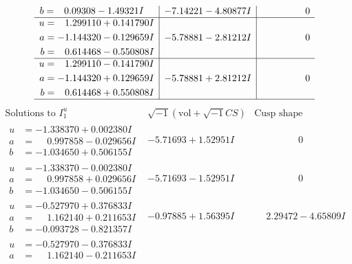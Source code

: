 \documentclass[1p]{elsarticle_modified}
\theoremstyle{definition}
\newcommand{\I}{\sqrt{-1}}
\begin{document}
$$\begin{array}{c|c|c}
\begin{aligned}
b &= \phantom{-}0.09308 - 1.49321 I\end{aligned}
 & -7.14221 - 4.80877 I & \phantom{-0.000000 } 0 \\ \hline\begin{aligned}
u &= \phantom{-}1.299110 + 0.141790 I \\
a &= -1.144320 - 0.129659 I \\
b &= \phantom{-}0.614468 - 0.550808 I\end{aligned}
 & -5.78881 - 2.81212 I & \phantom{-0.000000 } 0 \\ \hline\begin{aligned}
u &= \phantom{-}1.299110 - 0.141790 I \\
a &= -1.144320 + 0.129659 I \\
b &= \phantom{-}0.614468 + 0.550808 I\end{aligned}
 & -5.78881 + 2.81212 I & \phantom{-0.000000 } 0\\
 \hline 
 \end{array}$$\newpage$$\begin{array}{c|c|c}  
\text{Solutions to }I^u_{1}& \I (\text{vol} + \sqrt{-1}CS) & \text{Cusp shape}\\
 \hline 
\begin{aligned}
u &= -1.338370 + 0.002380 I \\
a &= \phantom{-}0.997858 - 0.029656 I \\
b &= -1.034650 + 0.506155 I\end{aligned}
 & -5.71693 + 1.52951 I & \phantom{-0.000000 } 0 \\ \hline\begin{aligned}
u &= -1.338370 - 0.002380 I \\
a &= \phantom{-}0.997858 + 0.029656 I \\
b &= -1.034650 - 0.506155 I\end{aligned}
 & -5.71693 - 1.52951 I & \phantom{-0.000000 } 0 \\ \hline\begin{aligned}
u &= -0.527970 + 0.376833 I \\
a &= \phantom{-}1.162140 + 0.211653 I \\
b &= -0.093728 - 0.821357 I\end{aligned}
 & -0.97885 + 1.56395 I & \phantom{-}2.29472 - 4.65809 I \\ \hline\begin{aligned}
u &= -0.527970 - 0.376833 I \\
a &= \phantom{-}1.162140 - 0.211653 I \\

\end{aligned}
\end{array}$$
\end{document}
